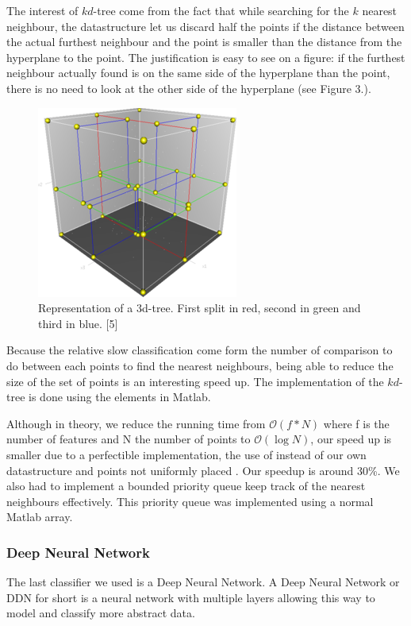 \documentclass{article} %
\begin{document}
The interest of $kd$-tree come from the fact that while searching for the $k$ nearest neighbour, the datastructure let us discard half the points if the distance between the actual furthest neighbour and the point is smaller than the distance from the hyperplane to the point. The justification is easy to see on a figure: if the furthest neighbour actually found is on the same side of the hyperplane than the point, there is no need to look at the other side of the hyperplane (see Figure 3.).
\begin{figure}
\centering
\includegraphics[scale=0.8]{3dtree.png}
\caption{Representation of a $3$d-tree. First split in red, second in green and third in blue. [5]}
\end{figure}
Because the relative slow classification come form the number of comparison to do between each points to find the nearest neighbours, being able to reduce the size of the set of points is an interesting speed up. The implementation of the $kd$-tree is done using the  elements in Matlab. 

Although in theory, we reduce the running time from $\mathcal{O}(f*N)$ where f is the number of features and N the number of points to $\mathcal{O}(\log{}N)$, our speed up is smaller due to a perfectible implementation, the use of  instead of our own datastructure and points not uniformly placed . Our speedup is around $30$\%.
We also had to implement a bounded priority queue keep track of the nearest neighbours effectively. This priority queue was implemented using a normal Matlab array.




\subsubsection{Deep Neural Network}

The last classifier we used is a Deep Neural Network. A Deep Neural Network or DDN for short is a neural network with multiple layers allowing this way to model and classify more abstract data. 
\end{document}
